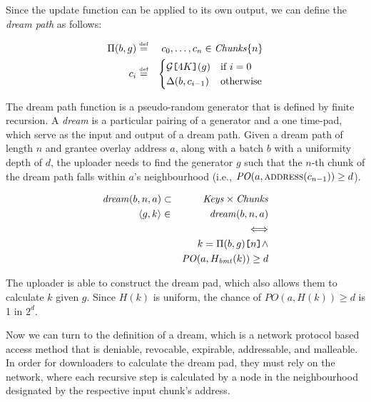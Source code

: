 Since the update function can be applied to its own output, we can define the \emph{dream path} as follows:


\begin{eqnarray}
\Pi(b,g)&\overset{\textrm{\tiny def}}{=}&c_0,\ldots, c_n\in\mathit{Chunks}\{n\}\\
c_i&\overset{\textrm{\tiny def}}{=}&\begin{cases}
\mathcal{G}\texttt{[}\/4K\/\texttt{]}(g) &\text{if }i=0\\   
\Delta(b,c_{i-1}) &\text{otherwise}
\end{cases}
\end{eqnarray}

The dream path function is a pseudo-random generator that is defined by finite recursion. A \emph{dream} is a particular pairing of a generator and a one time-pad, which serve as the input and output of a dream path.
Given a dream path of length $n$ and grantee overlay address $a$, along with a batch $b$ with a uniformity depth of $d$, the uploader needs to find the generator $g$ such that the $n$-th chunk of the dream path falls within $a$'s neighbourhood (i.e., $\mathit{PO}(a,\textsc{address}(c_{n-1}))\geq d$).

\begin{eqnarray}
\mathit{dream}(b,n,a) &\subset &\mathit{Keys}\times\mathit{Chunks}\\
\langle g, k\rangle &\in& \mathit{dream}(b,n,a) \\
&&\Longleftrightarrow\\
&&k=\Pi(b,g)\texttt{[}\/n\/\texttt{]}
\land\\
&&\mathit{PO}(a,H_{\mathit{bmt}}(k))\geq d
\end{eqnarray}

The uploader is able to construct the dream pad, which also allows them to calculate $k$ given $g$. Since $\mathit{H}(k)$ is uniform, the chance of $\mathit{PO}(a,\mathit{H}(k))\geq d$ is 1 in $2^{d}$. 



Now we can turn to the definition of a dream, which is a network protocol based access method that is deniable, revocable, expirable, addressable, and malleable. In order for downloaders to calculate the dream pad, they must rely on the network, where each recursive step is calculated by a node in the neighbourhood designated by the respective input chunk's address. 

